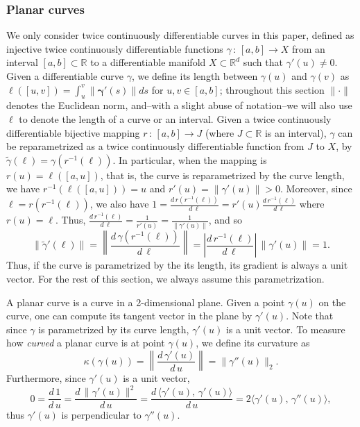 \documentclass[english]{article}
\newcommand{\real}{\mathbb{R}}
\begin{document}
\subsubsection{Planar curves}
\label{sec:app_planar}
We only consider twice continuously differentiable curves in this paper, defined as injective twice continuously differentiable functions $\gamma\,:\,  [a,b] \rightarrow X$ from an interval $[a,b]\subset \real$ to a differentiable manifold $X \subset \real^d$  such that $\gamma'(u) \neq 0$.  
Given a differentiable curve $\gamma$, we define its length between $\gamma(u)$ and $\gamma(v)$ as $\ell([u,v]) = \int_{u}^{v} \|\mathbf{\gamma}'(s)\| ds$ for $u,v \in [a,b]$; throughout this section $\|\cdot\|$ denotes the Euclidean norm, and--with a slight abuse of notation--we will also use $\ell$ to denote the length of a curve or an interval.
Given a twice continuously differentiable bijective mapping $r\,:\, [a,b] \rightarrow J$ (where $J \subset \real$ is an interval), $\gamma$ can be reparametrized as a twice continuously differentiable function from $J$ to $X$, by $\tilde{\gamma}(\ell) = \gamma(r^{-1}(\ell))$.
In particular, when the mapping is $r(u) = \ell([a,u])$, that is, the curve is reparametrized by the curve length, we have $r^{-1}(\ell([a,u]))=u$ and $r'(u) = \|\gamma'(u)\| >0$. 
Moreover, since $\ell = r(r^{-1}(\ell))$, we also have $1 = \frac{d\, r(r^{-1}(\ell))}{d\, \ell} = r'(u)\frac{d\, r^{-1}(\ell)}{d\, \ell}$
where $r(u) = \ell$. Thus, $\frac{d\, r^{-1}(\ell)}{d\, \ell} = \frac{1}{r'(u)} = \frac{1}{\|\gamma'(u)\|}$, and so
\[
\|\tilde{\gamma}'(\ell)\| = \left\|\frac{d\, \gamma(r^{-1}(\ell))}{d\, \ell}\right\| =\left|\frac{d\, r^{-1}(\ell)}{d\, \ell}\right|\,  \left\|\gamma'(u)\right\| = 1.
\] 
Thus, if the curve is parametrized by the its length, its gradient is always a unit vector. For the rest of this section, we always assume this parametrization. %

A planar curve is a curve in a 2-dimensional plane. Given a point $\gamma(u)$ on the curve, one can compute its tangent vector in the plane by $\gamma'(u)$. Note that since $\gamma$ is parametrized by its curve length, $\gamma'(u)$ is a unit vector. To measure how \emph{curved} a planar curve is at point $\gamma(u)$, we define its curvature as 
\[
\kappa(\gamma(u)) = \left\| \frac{d\, \gamma'(u)}{d\, u}\right\| = \| \gamma''(u)\|_2. 
\]
Furthermore, since $\gamma'(u)$ is a unit vector, 
\[
0 = \frac{d\, 1}{d\, u} = \frac{d\, \|\gamma'(u)\|^2}{d\, u} = \frac{d\, \langle \gamma'(u),\, \gamma'(u)\rangle}{d\, u} = 2\langle \gamma'(u) ,\, \gamma''(u)\rangle,
\] 
thus $\gamma'(u)$ is perpendicular to $\gamma''(u)$. 
\end{document}

